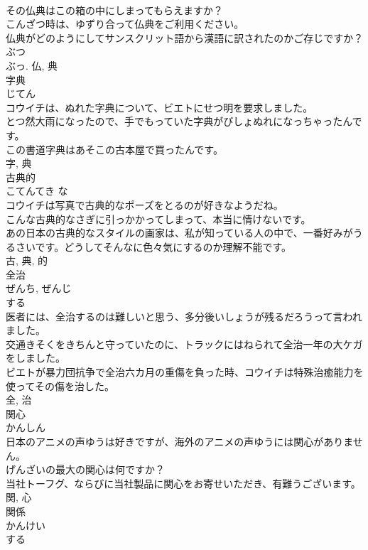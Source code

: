\documentclass[8pt]{extreport}
\begin{document}
\begin{CJK}{UTF8}{min}
\\	その仏典はこの箱の中にしまってもらえますか？	
\\	こんざつ時は、ゆずり合って仏典をご利用ください。	
\\	仏典がどのようにしてサンスクリット語から漢語に訳されたのかご存じですか？	
\\	ぶつ 
\\	ぶっ.	仏, 典	
\\	字典	
\\	じてん	
\\	コウイチは、ぬれた字典について、ビエトにせつ明を要求しました。	
\\	とつ然大雨になったので、手でもっていた字典がびしょぬれになっちゃったんです。	
\\	この書道字典はあそこの古本屋で買ったんです。	
\\	字, 典	
\\	古典的	
\\	こてんてき	な 
\\	コウイチは写真で古典的なポーズをとるのが好きなようだね。	
\\	こんな古典的なさぎに引っかかってしまって、本当に情けないです。	
\\	あの日本の古典的なスタイルの画家は、私が知っている人の中で、一番好みがうるさいです。どうしてそんなに色々気にするのか理解不能です。	
\\	古, 典, 的	
\\	全治	
\\	ぜんち, ぜんじ	
\\	する 
\\	医者には、全治するのは難しいと思う、多分後いしょうが残るだろうって言われました。	
\\	交通きそくをきちんと守っていたのに、トラックにはねられて全治一年の大ケガをしました。	
\\	ビエトが暴力団抗争で全治六カ月の重傷を負った時、コウイチは特殊治癒能力を使ってその傷を治した。	
\\	全, 治	
\\	関心	
\\	かんしん	
\\	日本のアニメの声ゆうは好きですが、海外のアニメの声ゆうには関心がありません。	
\\	げんざいの最大の関心は何ですか？	
\\	当社トーフグ、ならびに当社製品に関心をお寄せいただき、有難うございます。	
\\	関, 心	
\\	関係	
\\	かんけい	
\\	する 

\end{CJK}
\end{document}
